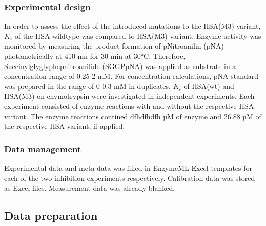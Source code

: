 \documentclass[letterpaper,10pt,english]{jupyterBook}
\begin{document}
\subsubsection{Experimental design}
\label{\detokenize{scenarios/chymotrypsin_inhibition:experimental-design}}
\sphinxAtStartPar
In order to assess the effect of the introduced mutations to the HSA(M3) variant, \(K_{i}\) of the HSA wild\sphinxhyphen{}type was compared to HSA(M3) variant. Enzyme activity was monitored by measuring the product formation of p\sphinxhyphen{}Nitroanilin (p\sphinxhyphen{}NA) photometrically at 410 nm for 30 min at 30°C. Therefore,  Succinyl\sphinxhyphen{}gly\sphinxhyphen{}gly\sphinxhyphen{}phe\sphinxhyphen{}p\sphinxhyphen{}nitroanilide (SGGPpNA) was applied as substrate in a concentration range of 0.25 \sphinxhyphen{} 2 mM. For concentration calculations, p\sphinxhyphen{}NA standard was prepared in the range of 0 \sphinxhyphen{} 0.3 mM in duplicates. \(K_{i}\) of HSA(wt) and HSA(M3) on chymotrypsin were investigated in independent experiments. Each experiment consisted of enzyme reactions with and without the respective HSA variant. The enzyme reactions contined dfhdfhdfh µM of enzyme and 26.88 µM of the respective HSA variant, if applied.


\subsubsection{Data management}
\label{\detokenize{scenarios/chymotrypsin_inhibition:data-management}}
\sphinxAtStartPar
Experimental data and meta data was filled in EnzymeML Excel templates for each of the two inhibition experiments respectively. Calibration data was stored as Excel files. Measurement data was already blanked.


\subsection{Data preparation}
\label{\detokenize{scenarios/chymotrypsin_inhibition:data-preparation}}
\end{document}
